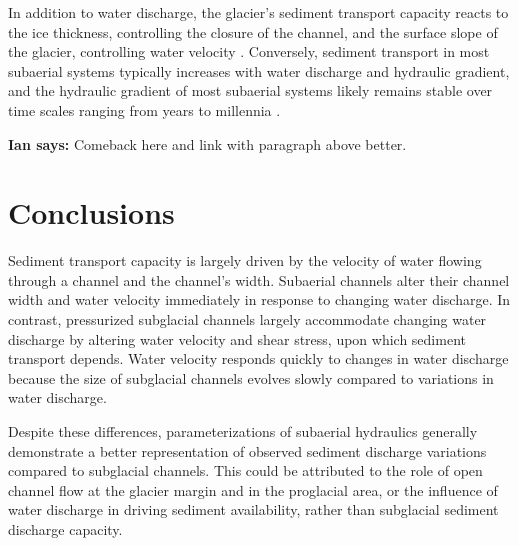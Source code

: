 \documentclass[11pt]{article}
\newcommand{\ian}[1]{{\textbf{\color{blue}Ian says:} \color{blue} #1} }
\begin{document}
In addition to water discharge, the glacier's sediment transport capacity reacts to the ice thickness, controlling the closure of the channel, and the surface slope of the glacier, controlling water velocity \citep[Section~\ref{sect:sub_mode}; ][]{rothlisberger1972,shreve1972,stevens2022}.
Conversely, sediment transport in most subaerial systems typically increases with water discharge and hydraulic gradient, and the hydraulic gradient of most subaerial systems likely remains stable over time scales ranging from years to millennia \citep[Section~\ref{sect:fluv}; e.g.][]{muller1968,whipple1999,wong2006,wickert2019}. 

\ian{Comeback here and link with paragraph above better.}


\section{Conclusions}

Sediment transport capacity is largely driven by the velocity of water flowing through a channel and the channel's width.
Subaerial channels  alter their channel width and water velocity immediately in response to changing water discharge.
In contrast, pressurized subglacial channels largely accommodate changing water discharge by altering water velocity and shear stress, upon which sediment transport depends.
Water velocity responds quickly to changes in water discharge because the size of subglacial channels evolves slowly compared to variations in water discharge.

Despite these differences, parameterizations of subaerial hydraulics generally demonstrate a better representation of observed sediment discharge variations compared to subglacial channels.
This could be attributed to the role of open channel flow at the glacier margin and in the proglacial area, or the influence of water discharge in driving sediment availability, rather than subglacial sediment discharge capacity.
\end{document}
